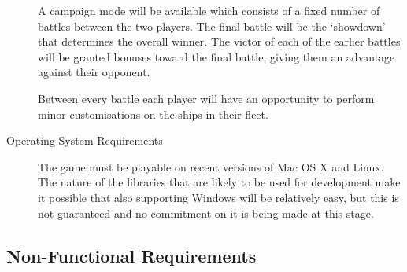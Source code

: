 \begin{description}
	A campaign mode will be available which consists of a fixed number of battles between the two players.
	The final battle will be the `showdown' that determines the overall winner. The victor of each of
	the earlier battles will be granted bonuses toward the final battle, giving them an advantage against
	their opponent.

	Between every battle each player will have an opportunity to perform minor customisations on
	the ships in their fleet.

	\item[Operating System Requirements]

	The game must be playable on recent versions of Mac OS X and Linux. The nature of the libraries that are likely to be used for development make it possible that also supporting Windows will be relatively easy, but this is not guaranteed and no commitment on it is being made at this stage.


\end{description}

\subsection{Non-Functional Requirements}

